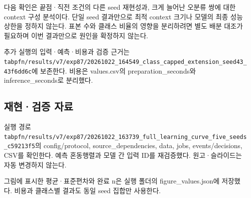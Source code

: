 다음 확인은 끝점·직전 조건의 다른 seed 재현성과, 크게 늘어난 오분류 쌍에 대한 context 구성 분석이다. 단일 seed 결과만으로 최적 context 크기나 모델의 최종 성능 상한을 정하지 않는다. 표본 수와 클래스 비율의 영향을 분리하려면 별도 배분 대조가 필요하며 이번 결과만으로 원인을 확정하지 않는다.

추가 실행의 입력·예측·비용과 검증 근거는 \texttt{tabpfn/\allowbreak{}\allowbreak{}r\allowbreak{}esults/\allowbreak{}\allowbreak{}v\allowbreak{}7/\allowbreak{}\allowbreak{}exp87/\allowbreak{}\allowbreak{}20261022\allowbreak{}\_\allowbreak{}\allowbreak{}164549\_\allowbreak{}\allowbreak{}class\_\allowbreak{}\allowbreak{}ca\allowbreak{}pped\_\allowbreak{}\allowbreak{}ext\allowbreak{}ension\_\allowbreak{}\allowbreak{}s\allowbreak{}eed43\_\allowbreak{}\allowbreak{}43\allowbreak{}f6dd6c}에 보존한다. 비용은 values.csv의 preparation\_\allowbreak{}seconds와 inference\_\allowbreak{}seconds로 분리했다.

\subsection{재현·검증 자료}
실행 경로 \texttt{tabpfn/\allowbreak{}\allowbreak{}r\allowbreak{}esults/\allowbreak{}\allowbreak{}v\allowbreak{}7/\allowbreak{}\allowbreak{}exp87/\allowbreak{}\allowbreak{}20261022\allowbreak{}\_\allowbreak{}\allowbreak{}163739\_\allowbreak{}\allowbreak{}full\_\allowbreak{}\allowbreak{}lea\allowbreak{}rning\_\allowbreak{}\allowbreak{}cu\allowbreak{}rve\_\allowbreak{}\allowbreak{}five\allowbreak{}\_\allowbreak{}\allowbreak{}seeds\_\allowbreak{}\allowbreak{}c\allowbreak{}59213f5}의 config/\allowbreak{}protocol, source\_\allowbreak{}dependencies, data, jobs, events/\allowbreak{}decisions, CSV를 확인한다. 예측 혼동행렬과 모델 간 입력 ID를 재검증했다. 원고·슬라이드는 자동 변경하지 않는다.

그림에 표시한 평균·표준편차와 완료 n은 실행 폴더의 figure\_\allowbreak{}values.json에 저장했다. 비용과 클래스별 결과도 동일 seed 집합만 사용한다.



